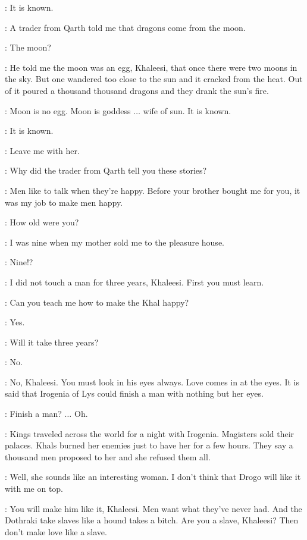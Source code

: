 \JHIQUI: It is known. 

\DOREAH: A trader from Qarth told me that dragons come from the moon. 

\DAENERYS: The moon? 

\DOREAH: He told me the moon was an egg, Khaleesi, that once there were two moons in the sky. But one wandered too close to the sun and it cracked from the heat. Out of it poured a thousand thousand dragons and they drank the sun's fire. 

\IRRI: Moon is no egg. Moon is goddess $\ldots$ wife of sun. It is known. 

\JHIQUI: It is known. 

\DAENERYS: Leave me with her. 


\DAENERYS: Why did the trader from Qarth tell you these stories? 

\DOREAH: Men like to talk when they're happy. Before your brother bought me for you, it was my job to make men happy. 

\DAENERYS: How old were you? 

\DOREAH: I was nine when my mother sold me to the pleasure house. 

\DAENERYS: Nine!?

\DOREAH: I did not touch a man for three years, Khaleesi. First you must learn. 

\DAENERYS: Can you teach me how to make the Khal happy? 

\DOREAH: Yes. 

\DAENERYS: Will it take three years? 

\DOREAH: No. 


\DOREAH: No, Khaleesi. You must look in his eyes always. Love comes in at the eyes. It is said that Irogenia of Lys could finish a man with nothing but her eyes. 

\DAENERYS: Finish a man? $\ldots$ Oh.

\DOREAH: Kings traveled across the world for a night with Irogenia. Magisters sold their palaces. Khals burned her enemies just to have her for a few hours. They say a thousand men proposed to her and she refused them all. 

\DAENERYS: Well, she sounds like an interesting woman. I don't think that Drogo will like it with me on top. 

\DOREAH: You will make him like it, Khaleesi. Men want what they've never had. And the Dothraki take slaves like a hound takes a bitch. Are you a slave, Khaleesi? Then don't make love like a slave. 

